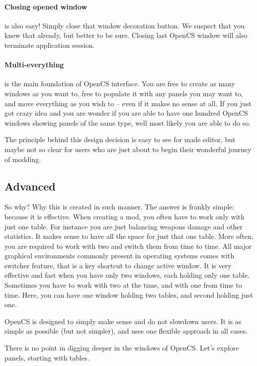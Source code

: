 \paragraph{Closing opened window}
is also easy! Simply close that window decoration button. We suspect that you knew that already, but better to be sure. 
Closing last Open{CS} window will also terminate application session.

\paragraph{Multi-everything}
is the main foundation of Open{CS} interface. You are free to create as many windows as you want to, free to populate it with 
any panels you may want to, and move everything as you wish to -- even if it makes no sense at all. If you just got crazy idea and
you are wonder if you are able to have one hundred Open{CS} windows showing panels of the same type, well most likely you are
able to do so.

The principle behind this design decision is easy to see for \BS made editor, but maybe not so clear for users who are
just about to begin their wonderful journey of modding.

\subsection{Advanced}
So why? Why this is created in such manner. The answer is frankly simple: because it is effective. When creating a mod, you often
have to work only with just one table. For instance you are just balancing weapons damage and other statistics. It makes sense
to have all the space for just that one table. More often, you are required to work with two and switch them from time to time.
All major graphical environments commonly present in operating systems comes with switcher feature, that is a key shortcut to change
active window. It is very effective and fast when you have only two windows, each holding only one table. Sometimes you have to work
with two at the time, and with one from time to time. Here, you can have one window holding two tables, and second holding just one.

Open{CS} is designed to simply make sense and do not slowdown users. It is as simple as possible (but not simpler), and uses one
flexible approach in all cases.

There is no point in digging deeper in the windows of Open{CS}. Let's explore panels, starting with tables.

